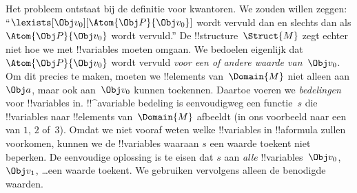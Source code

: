 \documentclass[openany]{memoir}
\begin{document}
Het probleem ontstaat bij de definitie voor kwantoren. We zouden
willen zeggen: ``$\lexists[\Obj v_0][\Atom{\Obj P}{\Obj v_0}]$ wordt
vervuld dan en slechts dan als $\Atom{\Obj P}{\Obj v_0}$ wordt
vervuld.'' De !!{structure}~$\Struct{M}$ zegt echter niet hoe we met
!!{variable}s moeten omgaan. We bedoelen eigenlijk dat
$\Atom{\Obj P}{\Obj v_0}$ wordt vervuld \emph{voor een of andere waarde
van~$\Obj v_0$}. Om dit precies te maken, moeten we !!{element}s
van~$\Domain{M}$ niet alleen aan $\Obj a$, maar ook aan~$\Obj v_0$
kunnen toekennen. Daartoe voeren we \emph{bedelingen} voor
!!{variable}s in.
!!^a{variable} bedeling is eenvoudigweg een functie~$s$ die
!!{variable}s naar !!{element}s van~$\Domain{M}$ afbeeldt (in ons
voorbeeld naar een van $1$, $2$ of~$3$). Omdat we niet vooraf weten
welke !!{variable}s in !!a{formula} zullen voorkomen, kunnen we de
!!{variable}s waaraan $s$ een waarde toekent niet beperken. De
eenvoudige oplossing is te eisen dat $s$ aan \emph{alle}
!!{variable}s~$\Obj v_0$, $\Obj v_1$, \dots\@ een waarde toekent. We
gebruiken vervolgens alleen de benodigde waarden.
\end{document}
